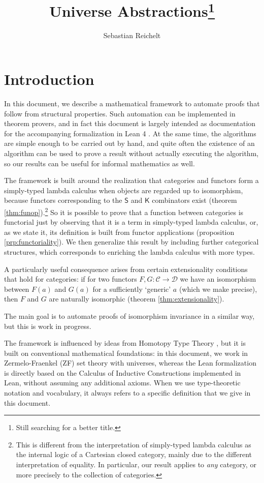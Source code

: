 \documentclass[a4paper]{article}
\title{Universe Abstractions\footnote{Still searching for a better title.}}
\author{Sebastian Reichelt}
\theoremstyle{definition}
\theoremstyle{remark}
\newcommand{\C}{\mathcal{C}}
\newcommand{\D}{\mathcal{D}}
\newcommand{\nm}{\mathsf}
\begin{document}
\maketitle

\section{Introduction}

In this document, we describe a mathematical framework to automate proofs that follow from structural
properties. Such automation can be implemented in theorem provers, and in fact this document is
largely intended as documentation for the accompanying formalization in Lean 4 \cite{lean4}.
At the same time, the algorithms are simple enough to be carried out by hand, and quite often the
existence of an algorithm can be used to prove a result without actually executing the algorithm, so
our results can be useful for informal mathematics as well.

The framework is built around the realization that categories and functors form a simply-typed lambda
calculus \cite{simply-typed-lambda-calculus} when objects are regarded up to isomorphism, because
functors corresponding to the $\nm{S}$ and $\nm{K}$ combinators exist (theorem
\ref{thm:funop}).\footnote{This is different from the interpretation of simply-typed lambda calculus
as the internal logic of a Cartesian closed category, mainly due to the different interpretation of
equality. In particular, our result applies to \emph{any} category, or more precisely to the
collection of categories.}
So it is possible to prove that a function between categories is functorial just by observing that it
is a term in simply-typed lambda calculus, or, as we state it, its definition is built from functor
applications (proposition \ref{prp:functoriality}). We then generalize this result by including
further categorical structures, which corresponds to enriching the lambda calculus with more types.

A particularly useful consequence arises from certain extensionality conditions that hold for
categories: if for two functors $F,G : \C \to \D$ we have an isomorphism between $F(a)$ and $G(a)$
for a sufficiently `generic' $a$ (which we make precise), then $F$ and $G$ are naturally isomorphic
(theorem \ref{thm:extensionality}).

The main goal is to automate proofs of isomorphism invariance in a similar way, but this is work in
progress.

The framework is influenced by ideas from Homotopy Type Theory \cite{hottbook}, but it is built on
conventional mathematical foundations: in this document, we work in Zermelo-Fraenkel (ZF) set
theory with universes, whereas the Lean formalization is directly based on the Calculus of Inductive
Constructions implemented in Lean, without assuming any additional axioms. When we use
type-theoretic notation and vocabulary, it always refers to a specific definition that we give in
this document.
\end{document}

